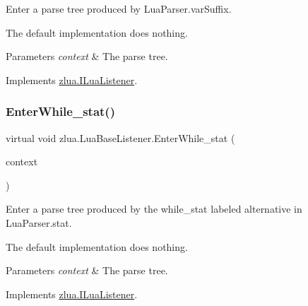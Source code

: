 Enter a parse tree produced by Lua\+Parser.\+var\+Suffix. 

The default implementation does nothing.


\begin{DoxyParams}{Parameters}
{\em context} & The parse tree.\\
\hline
\end{DoxyParams}


Implements \mbox{\hyperlink{interfacezlua_1_1_i_lua_listener_ad0b34682777b85c6d6fef1d0488b32a4}{zlua.\+I\+Lua\+Listener}}.

\mbox{\label{classzlua_1_1_lua_base_listener_a9b8d8a799001a9167716f892e540ba76}} 
\subsubsection{\texorpdfstring{Enter\+While\+\_\+stat()}{EnterWhile\_stat()}}
{\footnotesize\ttfamily virtual void zlua.\+Lua\+Base\+Listener.\+Enter\+While\+\_\+stat (\begin{DoxyParamCaption}\item[{\mbox{[}\+Not\+Null\mbox{]} \mbox{\hyperlink{classzlua_1_1_lua_parser_1_1_while__stat_context}{Lua\+Parser.\+While\+\_\+stat\+Context}}}]{context }\end{DoxyParamCaption})\hspace{0.3cm}{\ttfamily [virtual]}}



Enter a parse tree produced by the {\ttfamily while\+\_\+stat} labeled alternative in Lua\+Parser.\+stat. 

The default implementation does nothing.


\begin{DoxyParams}{Parameters}
{\em context} & The parse tree.\\
\hline
\end{DoxyParams}


Implements \mbox{\hyperlink{interfacezlua_1_1_i_lua_listener_abc1fb6386fa985aa88c2813bc1040876}{zlua.\+I\+Lua\+Listener}}.

\mbox{\label{classzlua_1_1_lua_base_listener_aee2d21cae37901e87685fc50c87f8f1f}} 
